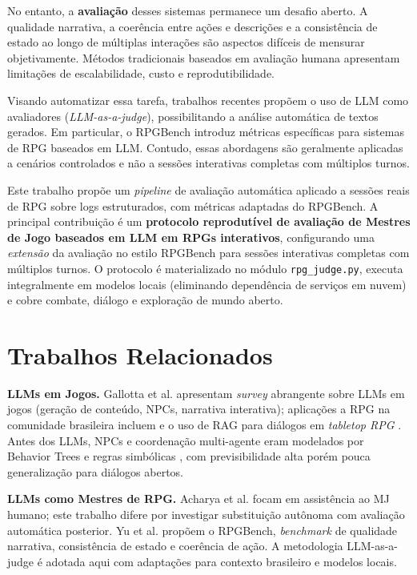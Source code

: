 \documentclass[12pt]{article}
\begin{document}
No entanto, a \textbf{avaliação} desses sistemas permanece um desafio aberto. A qualidade narrativa, a coerência entre ações e descrições e a consistência de estado ao longo de múltiplas interações são aspectos difíceis de mensurar objetivamente. Métodos tradicionais baseados em avaliação humana apresentam limitações de escalabilidade, custo e reprodutibilidade.

Visando automatizar essa tarefa, trabalhos recentes propõem o uso de LLM como avaliadores (\textit{LLM-as-a-judge}), possibilitando a análise automática de textos gerados. Em particular, o RPGBench \cite{yu:2025} introduz métricas específicas para sistemas de RPG baseados em LLM. Contudo, essas abordagens são geralmente aplicadas a cenários controlados e não a sessões interativas completas com múltiplos turnos.

Este trabalho propõe um \textit{pipeline} de avaliação automática aplicado a sessões reais de RPG sobre logs estruturados, com métricas adaptadas do RPGBench. A principal contribuição é um \textbf{protocolo reprodutível de avaliação de Mestres de Jogo baseados em LLM em RPGs interativos}, configurando uma \textit{extensão} da avaliação no estilo RPGBench \cite{yu:2025} para sessões interativas completas com múltiplos turnos. O protocolo é materializado no módulo \texttt{rpg\_judge.py}, executa integralmente em modelos locais (eliminando dependência de serviços em nuvem) e cobre combate, diálogo e exploração de mundo aberto.

\section{Trabalhos Relacionados}

\textbf{LLMs em Jogos.}
Gallotta et al. \cite{gallotta:2024} apresentam \textit{survey} abrangente sobre LLMs em jogos (geração de conteúdo, NPCs, narrativa interativa); aplicações a RPG na comunidade brasileira incluem \cite{sbgames:llm:2025} e o uso de RAG para diálogos em \textit{tabletop RPG} \cite{sbgames:tabletop:2025}. Antes dos LLMs, NPCs e coordenação multi-agente eram modelados por Behavior Trees e regras simbólicas \cite{agis:2020}, com previsibilidade alta porém pouca generalização para diálogos abertos.

\textbf{LLMs como Mestres de RPG.}
Acharya et al. \cite{acharya:2023} focam em assistência ao MJ humano; este trabalho difere por investigar substituição autônoma com avaliação automática posterior. Yu et al. \cite{yu:2025} propõem o RPGBench, \textit{benchmark} de qualidade narrativa, consistência de estado e coerência de ação. A metodologia LLM-as-a-judge é adotada aqui com adaptações para contexto brasileiro e modelos locais.
\end{document}
